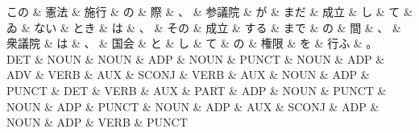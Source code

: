 \documentclass[tikz,border=5pt]{standalone}
\begin{document}
\small
\begin{dependency}[edge unit distance=12.0pt]
    \begin{deptext}[column sep=0.5em]
        この \& 憲法 \& 施行 \& の \& 際 \& 、 \& 参議院 \& が \& まだ \& 成立 \& し \& て \& ゐ \& ない \& とき \& は \& 、 \& その \& 成立 \& する \& まで \& の \& 間 \& 、 \& 衆議院 \& は \& 、 \& 国会 \& と \& し \& て \& の \& 権限 \& を \& 行ふ \& 。\\
        DET \& NOUN \& NOUN \& ADP \& NOUN \& PUNCT \& NOUN \& ADP \& ADV \& VERB \& AUX \& SCONJ \& VERB \& AUX \& NOUN \& ADP \& PUNCT \& DET \& VERB \& AUX \& PART \& ADP \& NOUN \& PUNCT \& NOUN \& ADP \& PUNCT \& NOUN \& ADP \& AUX \& SCONJ \& ADP \& NOUN \& ADP \& VERB \& PUNCT\\
    \end{deptext}
\end{dependency}
\end{document}
